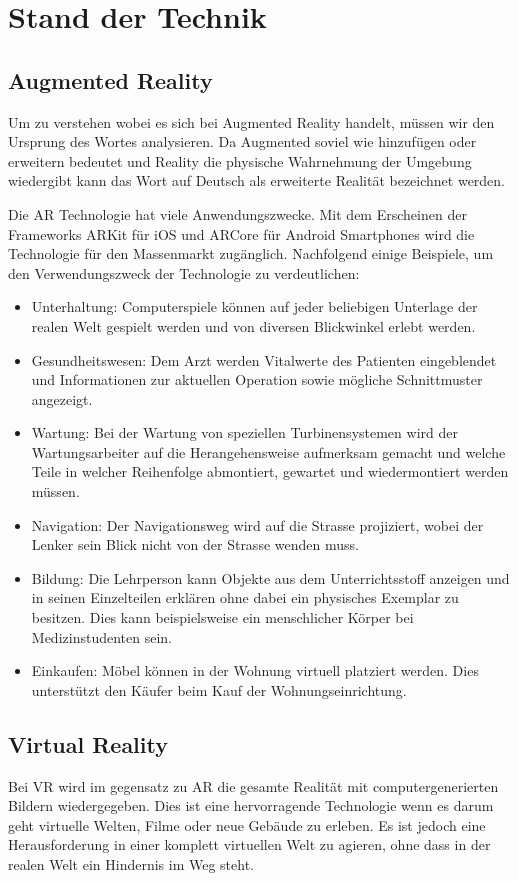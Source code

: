 \section{Stand der Technik}

\subsection{Augmented Reality} \label{sub:augmented-reality}
Um zu verstehen wobei es sich bei Augmented Reality handelt, müssen wir den Ursprung des Wortes analysieren. Da Augmented soviel wie hinzufügen oder erweitern bedeutet und Reality die physische Wahrnehmung der Umgebung wiedergibt kann das Wort auf Deutsch als erweiterte Realität bezeichnet werden.

Die AR Technologie hat viele Anwendungszwecke.
Mit dem Erscheinen der Frameworks ARKit für iOS und ARCore für Android Smartphones wird die Technologie für den Massenmarkt zugänglich.
Nachfolgend einige Beispiele, um den Verwendungszweck der Technologie zu verdeutlichen:
\begin{itemize}
    \item Unterhaltung: Computerspiele können auf jeder beliebigen Unterlage der realen Welt gespielt werden und von diversen Blickwinkel erlebt werden.
    \item Gesundheitswesen: Dem Arzt werden Vitalwerte des Patienten eingeblendet und Informationen zur aktuellen Operation sowie mögliche Schnittmuster angezeigt.
    \item Wartung: Bei der Wartung von speziellen Turbinensystemen wird der Wartungsarbeiter auf die Herangehensweise aufmerksam gemacht und welche Teile in welcher Reihenfolge abmontiert, gewartet und wiedermontiert werden müssen.
    \item Navigation: Der Navigationsweg wird auf die Strasse projiziert, wobei der Lenker sein Blick nicht von der Strasse wenden muss.
    \item Bildung: Die Lehrperson kann Objekte aus dem Unterrichtsstoff anzeigen und in seinen Einzelteilen erklären ohne dabei ein physisches Exemplar zu besitzen. Dies kann beispielsweise ein menschlicher Körper bei Medizinstudenten sein.
    \item Einkaufen: Möbel können in der Wohnung virtuell platziert werden. Dies unterstützt den Käufer beim Kauf der Wohnungseinrichtung.
\end{itemize}


\subsection{Virtual Reality} \label{sub:virtual-reality}
Bei VR wird im gegensatz zu AR die gesamte Realität mit computergenerierten Bildern wiedergegeben. Dies ist eine hervorragende Technologie wenn es darum geht virtuelle Welten, Filme oder neue Gebäude zu erleben. Es ist jedoch eine Herausforderung in einer komplett virtuellen Welt zu agieren, ohne dass in der realen Welt ein Hindernis im Weg steht.

